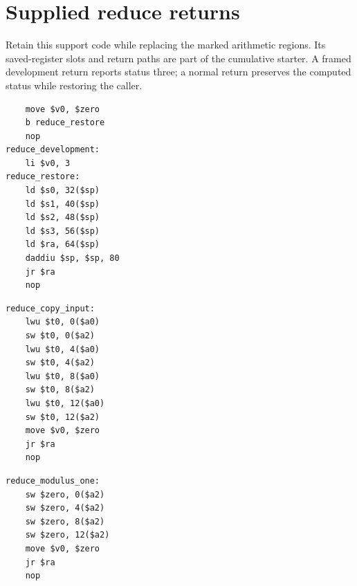 \section{Supplied reduce returns}
Retain this support code while replacing the marked arithmetic regions. Its saved-register slots and return paths are part of the cumulative starter. A framed development return reports status three; a normal return preserves the computed status while restoring the caller.

\begin{verbatim}
    move $v0, $zero
    b reduce_restore
    nop
reduce_development:
    li $v0, 3
reduce_restore:
    ld $s0, 32($sp)
    ld $s1, 40($sp)
    ld $s2, 48($sp)
    ld $s3, 56($sp)
    ld $ra, 64($sp)
    daddiu $sp, $sp, 80
    jr $ra
    nop
\end{verbatim}
\begin{verbatim}
reduce_copy_input:
    lwu $t0, 0($a0)
    sw $t0, 0($a2)
    lwu $t0, 4($a0)
    sw $t0, 4($a2)
    lwu $t0, 8($a0)
    sw $t0, 8($a2)
    lwu $t0, 12($a0)
    sw $t0, 12($a2)
    move $v0, $zero
    jr $ra
    nop
\end{verbatim}
\begin{verbatim}
reduce_modulus_one:
    sw $zero, 0($a2)
    sw $zero, 4($a2)
    sw $zero, 8($a2)
    sw $zero, 12($a2)
    move $v0, $zero
    jr $ra
    nop
\end{verbatim}
